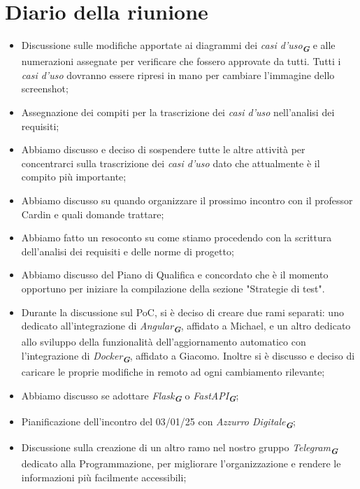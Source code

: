 
\section{Diario della riunione}

\begin{itemize}
    \item Discussione sulle modifiche apportate ai diagrammi dei \emph{casi d'uso}\textsubscript{\textit{\textbf{G}}} e alle numerazioni assegnate per verificare che fossero approvate da tutti. Tutti i \emph{casi d'uso} dovranno essere ripresi in mano per cambiare l'immagine dello screenshot;
    \item Assegnazione dei compiti per la trascrizione dei \emph{casi d'uso} nell'analisi dei requisiti;
    \item Abbiamo discusso e deciso di sospendere tutte le altre attività per concentrarci sulla trascrizione dei \emph{casi d'uso} dato che attualmente è il compito più importante;
    \item Abbiamo discusso su quando organizzare il prossimo incontro con il professor Cardin e quali domande trattare;
    \item Abbiamo fatto un resoconto su come stiamo procedendo con la scrittura dell'analisi dei requisiti e delle norme di progetto;
    \item Abbiamo discusso del Piano di Qualifica e concordato che è il momento opportuno per iniziare la compilazione della sezione "Strategie di test".
    \item Durante la discussione sul PoC, si è deciso di creare due rami separati: uno dedicato all'integrazione di \emph{Angular}\textsubscript{\textit{\textbf{G}}}, affidato a Michael, e un altro dedicato allo sviluppo della funzionalità dell'aggiornamento automatico con l'integrazione di \emph{Docker}\textsubscript{\textit{\textbf{G}}}, affidato a Giacomo. Inoltre si è discusso e deciso di caricare le proprie modifiche in remoto ad ogni cambiamento rilevante;
    \item Abbiamo discusso se adottare \emph{Flask}\textsubscript{\textit{\textbf{G}}} o \emph{FastAPI}\textsubscript{\textit{\textbf{G}}}; 
    \item Pianificazione dell'incontro del 03/01/25 con \emph{Azzurro Digitale}\textsubscript{\textit{\textbf{G}}};
    \item Discussione sulla creazione di un altro ramo nel nostro gruppo \emph{Telegram}\textsubscript{\textit{\textbf{G}}} dedicato alla Programmazione, per migliorare l'organizzazione e rendere le informazioni più facilmente accessibili;
 \end{itemize}
